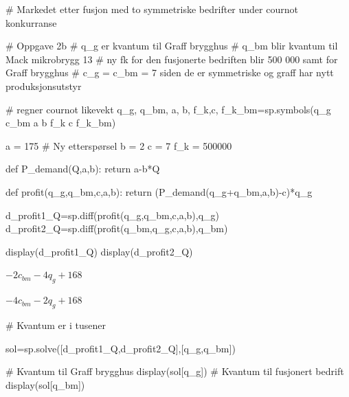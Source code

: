 \documentclass[
  12pt,
  a4paper,
  DIV=11,
  numbers=noendperiod]{scrartcl}
\newenvironment{Shaded}{\begin{snugshade}}{\end{snugshade}}
\newcommand{\CommentTok}[1]{\textcolor[rgb]{0.37,0.37,0.37}{#1}}
\newcommand{\ControlFlowTok}[1]{\textcolor[rgb]{0.00,0.23,0.31}{#1}}
\newcommand{\DecValTok}[1]{\textcolor[rgb]{0.68,0.00,0.00}{#1}}
\newcommand{\KeywordTok}[1]{\textcolor[rgb]{0.00,0.23,0.31}{#1}}
\newcommand{\NormalTok}[1]{\textcolor[rgb]{0.00,0.23,0.31}{#1}}
\newcommand{\OperatorTok}[1]{\textcolor[rgb]{0.37,0.37,0.37}{#1}}
\newcommand{\StringTok}[1]{\textcolor[rgb]{0.13,0.47,0.30}{#1}}
\begin{document}
\begin{Shaded}
\begin{Highlighting}[]
\CommentTok{\# Markedet etter fusjon med to symmetriske bedrifter under cournot konkurranse}

\CommentTok{\# Oppgave 2b}
\CommentTok{\# q\_g er kvantum til Graff brygghus}
\CommentTok{\# q\_bm blir kvantum til Mack mikrobrygg 13}
\CommentTok{\# ny fk for den fusjonerte bedriften blir 500 000 samt for Graff brygghus}
\CommentTok{\# c\_g = c\_bm = 7 siden de er symmetriske og graff har nytt produksjonsutstyr}

\CommentTok{\# regner cournot likevekt}
\NormalTok{q\_g, q\_bm, a, b, f\_k,c, f\_k\_bm}\OperatorTok{=}\NormalTok{sp.symbols(}\StringTok{\textquotesingle{}q\_g c\_bm a b f\_k c f\_k\_bm\textquotesingle{}}\NormalTok{)}

\NormalTok{a }\OperatorTok{=} \DecValTok{175}
\CommentTok{\# Ny etterspørsel}
\NormalTok{b }\OperatorTok{=} \DecValTok{2}
\NormalTok{c }\OperatorTok{=} \DecValTok{7}
\NormalTok{f\_k }\OperatorTok{=} \DecValTok{500000}

\KeywordTok{def}\NormalTok{ P\_demand(Q,a,b):}
    \ControlFlowTok{return}\NormalTok{ a}\OperatorTok{{-}}\NormalTok{b}\OperatorTok{*}\NormalTok{Q}


\KeywordTok{def}\NormalTok{ profit(q\_g,q\_bm,c,a,b):}
    \ControlFlowTok{return}\NormalTok{ (P\_demand(q\_g}\OperatorTok{+}\NormalTok{q\_bm,a,b)}\OperatorTok{{-}}\NormalTok{c)}\OperatorTok{*}\NormalTok{q\_g}
\end{Highlighting}
\end{Shaded}

\begin{Shaded}
\begin{Highlighting}[]
\NormalTok{d\_profit1\_Q}\OperatorTok{=}\NormalTok{sp.diff(profit(q\_g,q\_bm,c,a,b),q\_g)}
\NormalTok{d\_profit2\_Q}\OperatorTok{=}\NormalTok{sp.diff(profit(q\_bm,q\_g,c,a,b),q\_bm)}


\NormalTok{display(d\_profit1\_Q)}
\NormalTok{display(d\_profit2\_Q)}
\end{Highlighting}
\end{Shaded}

$\displaystyle - 2 c_{bm} - 4 q_{g} + 168$

$\displaystyle - 4 c_{bm} - 2 q_{g} + 168$

\begin{Shaded}
\begin{Highlighting}[]
\CommentTok{\# Kvantum er i tusener}

\NormalTok{sol}\OperatorTok{=}\NormalTok{sp.solve([d\_profit1\_Q,d\_profit2\_Q],[q\_g,q\_bm])}

\CommentTok{\# Kvantum til Graff brygghus}
\NormalTok{display(sol[q\_g])}
\CommentTok{\# Kvantum til fusjonert bedrift}
\NormalTok{display(sol[q\_bm])}
\end{Highlighting}
\end{Shaded}
\end{document}
